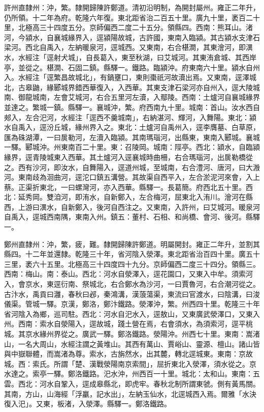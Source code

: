 \begin{pinyinscope}
許州直隸州：沖，繁。隸開歸陳許鄭道。清初沿明制，為開封屬州。雍正二年升，仍所領。十二年為府。乾隆六年復。東北距省治二百五十里。廣九十里，袤百二十里，北極高三十四度五分。京師偏西二度二十五分。領縣四。西南：熊耳山。渚河，今潁水，自襄城緣界入，逕潁陽故城，古許國，東南入臨潁。其古潁水支津石梁河。西北自禹入，左納暖泉河，逕城西。又東南，右合椹澗，其東澮河，即潩水，水經注「逕射犬城」，自長葛入，東至秋湖，曰艾城河。其東洧倉城、其西岸亭，並從之。椹澗、石固二鎮。縣驛一。鐵路。臨潁沖。府東南六十里。潁水自州入。水經注「逕繁昌故城北」，有鍋壅口，東則棗祇河故瀆出焉。又東南，逕澤城北，古皋鼬，緣郾城界錯西華復入，入西華。其東支津石梁河亦自州入，逕大陵城南、御龍城南，左會艾城河，右合五里河左瀆，入鄢陵。西南：土爐河自襄城緣界並達之。繁城一鎮。縣驛一。襄城沖，繁。府西南九十里。城南：首山。汝水西自郟入，左合汜河，水經注「逕西不羹城南」，右納湛河、輝河，入舞陽。東北：潁水自禹入，逕汾丘城，緣州界入之。東北：土爐河自禹州入，逕李膺墓、白草原，匯為硃湖潭，一曰扊勒河，左瀆入臨潁。其南瑪瑙河，出縣東，東南入郾城。襄城一驛。郾城沖。州東南百二十里。東：召陵岡。城南：陘亭。西北：潁水，自臨潁緣界，逕青陵城東入西華。其土爐河入逕襄城時曲柵，右合瑪瑙河，出扊勒橋從之。西有沙河，即汝水，自舞陽入，逕道州城，至城南，右合澧河、唐河，曰大溵河。東南歧為洄曲河，逕沱口鎮五溝營。其故渠自西平入，左合淤泥河來會，入上蔡。正渠折東北，一曰螺灣河，亦入西華。縣驛一。長葛簡。府西北五十里。西北：延秀岡。雙洎河，即洧水，自新鄭入，左合梅河，屈東北入洧川。澮河在縣西，上游曰潩水，自新鄭入，後河自西注之。又東南，入許州，曰艾城河。暖泉河自禹入，逕城西南隅，東南入州。鎮五：董村、石相、和尚橋、會河、後河。縣驛一。

鄭州直隸州：沖，繁，疲，難。隸開歸陳許鄭道。明屬開封。雍正二年升，並割其縣四。十二年並還隸。乾隆三十年，省河陰入滎澤。東北距省治百四十里。廣五十三里，袤六十五里。北極高三十四度四十九分。京師偏西二度三十四分。領縣三。西南：梅山。南：泰山。西北：河水自滎澤入，逕花園口，又東入中牟。須索河入，會京水，東逕衍南、祭城北，右合鄭水為沙河，一曰賈魯河，右合潮河從之。古汴水，禹貢曰灉，春秋曰邲，秦鴻溝，漢蒗蕩渠，東流曰官渡水，曰陰溝，曰浚儀渠。管城一驛。京漢，鄭洛，鄭汴鐵路。滎澤沖，繁。州西四十里。乾隆三十年省河陰入為鄉，巡司駐。西北：河水自汜水入，逕敖山，又東廣武滎澤口，又東入州。西南：索水自滎陽入，逕故城，踐土營在焉，右會須水，為須索河，逕平桃城。其京水緣州界從之。廣武一驛。鄭洛鐵路。滎陽沖。州西七十里。東南：嵩渚山，一名大周山，水經注謂之黃堆山。其西有萬山、賈峪山、靈源、檀山。諸山皆與中嶽聯體，而嵩渚為尊。索水，古旃然水，出其麓，轉北逕城東。東南：京故城。西：索氏。所謂「楚、漢戰滎陽南京索間」，屈折東北入滎澤，須水從之。京水達之。索亭一驛。鄭洛鐵路。汜水沖，州西百一十里。城北：太和山。東南：五雲。西北：河水自鞏入，逕成皋縣北，即虎牢。春秋北制所謂東虢。側有黃馬關。其南，方山，山海經「浮臝，記水出」，左納玉仙水，北逕城西入焉。爾雅「水決復入汜」。又東，板渚，入滎澤。縣驛一。鄭洛鐵路。


\end{pinyinscope}
